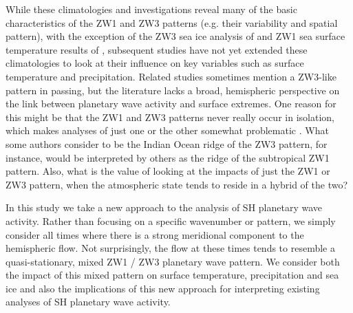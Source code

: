 While these climatologies and investigations reveal many of the basic characteristics of the ZW1 and ZW3 patterns (e.g. their variability and spatial pattern), with the exception of the ZW3 sea ice analysis of \citet{Raphael2007} and ZW1 sea surface temperature results of \citet{Hobbs2007}, subsequent studies have not yet extended these climatologies to look at their influence on key variables such as surface temperature and precipitation. Related studies \citep[e.g. of Australian rainfall variability;][]{Frederiksen2014} sometimes mention a ZW3-like pattern in passing, but the literature lacks a broad, hemispheric perspective on the link between planetary wave activity and surface extremes. One reason for this might be that the ZW1 and ZW3 patterns never really occur in isolation, which makes analyses of just one or the other somewhat problematic \citep{Hobbs2010}. What some authors consider to be the Indian Ocean ridge of the ZW3 pattern, for instance, would be interpreted by others \citep[e.g.][]{Hobbs2007} as the ridge of the subtropical ZW1 pattern. Also, what is the value of looking at the impacts of just the ZW1 or ZW3 pattern, when the atmospheric state tends to reside in a hybrid of the two? 

In this study we take a new approach to the analysis of SH planetary wave activity. Rather than focusing on a specific wavenumber or pattern, we simply consider all times where there is a strong meridional component to the hemispheric flow. Not surprisingly, the flow at these times tends to resemble a quasi-stationary, mixed ZW1 / ZW3 planetary wave pattern. We consider both the impact of this mixed pattern on surface temperature, precipitation and sea ice and also the implications of this new approach for interpreting existing analyses of SH planetary wave activity.